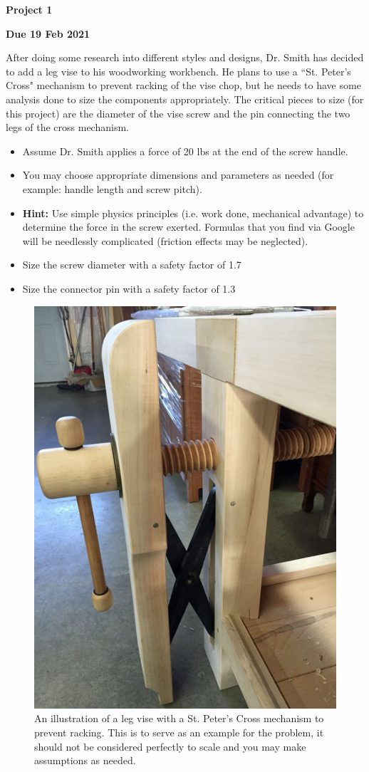 \documentclass[12pt, oneside]{article}
\begin{document}
\begin{center}
\textbf{\Large Project 1}

\textbf{Due 19 Feb 2021}
\end{center}

After doing some research into different styles and designs, Dr. Smith has decided to add a leg vise to his woodworking workbench.
He plans to use a ``St. Peter's Cross" mechanism to prevent racking of the vise chop, but he needs to have some analysis done to size the components appropriately.
The critical pieces to size (for this project) are the diameter of the vise screw and the pin connecting the two legs of the cross mechanism.
\begin{itemize}
	\item Assume Dr. Smith applies a force of 20 lbs at the end of the screw handle.
	\item You may choose appropriate dimensions and parameters as needed (for example: handle length and screw pitch). 
	\item \textbf{Hint:} Use simple physics principles (i.e. work done, mechanical advantage) to determine the force in the screw exerted. Formulas that you find via Google will be needlessly complicated (friction effects may be neglected).
	\item Size the screw diameter with a safety factor of 1.7
	\item Size the connector pin with a safety factor of 1.3
\end{itemize}
\begin{figure}[htpb]
	\centering
	\includegraphics[width=0.4\linewidth]{../../images/stpeterscross}
	\caption{An illustration of a leg vise with a St. Peter's Cross mechanism to prevent racking. This is to serve as an example for the problem, it should not be considered perfectly to scale and you may make assumptions as needed.}
\end{figure}
\end{document}
